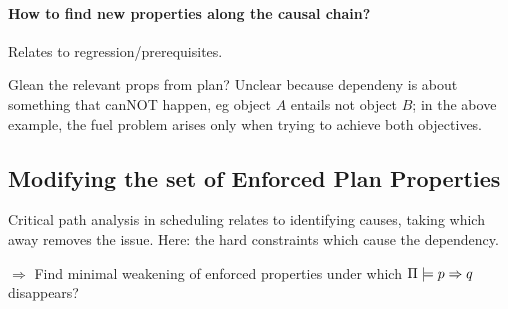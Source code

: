 
%
%



\paragraph{How to find new properties along the causal chain?}

Relates to regression/prerequisites.

Glean the relevant props from plan? Unclear because dependeny is about
something that canNOT happen, eg object $A$ entails not object $B$; in
the above example, the fuel problem arises only when trying to achieve
both objectives.







  


\subsection{Modifying the set of Enforced Plan Properties}
\label{xpp:identify-causes:enforced}

Critical path analysis in scheduling relates to identifying causes,
taking which away removes the issue. Here: the hard constraints which
cause the dependency.

$\Rightarrow$ Find minimal weakening of enforced properties under
which $\Pi \models p \Rightarrow q$ disappears?

